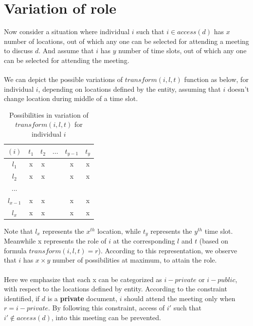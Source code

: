 \documentclass{article}
\begin{document}
\section{Variation of role}
\noindent
Now consider a situation where individual $i$ such that $i \in access(d)$ has $x$ number of locations, out of which any one can be selected for attending a meeting to discuss $d$. And assume that $i$ has $y$ number of time slots, out of which any one can be selected for attending the meeting.\\ \\
We can depict the possible variations of $transform(i, l, t)$ function as below, for individual $i$, depending on locations defined by the entity, assuming that $i$ doesn't change location during middle of a time slot.
\begin{table}[H]
    \centering
    \begin{tabular}{|c|c|c|c|c|c|}
    \hline
    $(i)$ & $t_1$ & $t_2$ & $...$ & $t_{y-1}$ & $t_{y}$ \\
    \hline
    $l_1$ & x & x & \  & x & x \\
    \hline
    $l_2$ & x & x & \  & x & x \\
    \hline
    $...$ & \  & \  & \  & \  & \  \\
    \hline
    $l_{x-1}$ & x & x & \  & x & x \\
    \hline
    $l_{x}$ & x & x & \  & x & x \\
    \hline
    \end{tabular}
    \caption{Possibilities in variation of $transform(i,l,t)$ for individual $i$}
    \label{tab:six_columns_six_rows}
\end{table}

\noindent
Note that $l_x$ represents the $x^{th}$ location, while $t_y$ represents the $y^{th}$ time slot. Meanwhile x represents the role of $i$ at the corresponding $l$ and $t$ (based on formula $transform(i, l, t) = r$). According to this representation, we observe that $i$ has $x \times y$ number of possibilities at maximum, to attain the role.\\ \\
Here we emphasize that each x can be categorized as $i-private$ or $i-public$, with respect to the locations defined by entity. According to the constraint identified, if $d$ is a \textbf{private} document, $i$ should attend the meeting only when $r = i-private$. By following this constraint, access of $i'$ such that $i' \notin aceess(d)$, into this meeting can be prevented.\\ \\ 
\end{document}
